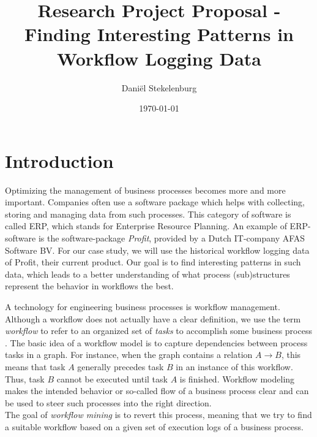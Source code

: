 \documentclass[a4paper,11pt]{article}
\begin{document}
\theoremstyle{plain}
\newtheorem{thm}{Theorem}{}

\theoremstyle{definition}
\newtheorem{defn}[thm]{Definition}

\renewcommand{\vec}[1]{\mathbf{#1}}

\title{Research Project Proposal - Finding Interesting Patterns in Workflow Logging Data}
\date{\today}
\author{
        Dani\"el Stekelenburg		
}
 
 
\maketitle

\abstract{}

\section{Introduction}
Optimizing the management of business processes becomes more and more important. Companies often use a software package which helps with collecting, storing and managing data from such processes. This category of software is called ERP, which stands for Enterprise Resource Planning. An example of ERP-software is the software-package \textit{Profit}, provided by a Dutch IT-company AFAS Software BV. For our case study, we will use the historical workflow logging data of Profit, their current product. Our goal is to find interesting patterns in such data, which leads to a better understanding of what process (sub)structures represent the behavior in workflows the best.

A technology for engineering business processes is workflow management. Although a workflow does not actually have a clear definition, we use the term \textit{workflow} to refer to an organized set of \textit{tasks} to accomplish some business process \cite{workflowManagement1995}. The basic idea of a workflow model is to capture dependencies between process tasks in a graph. For instance, when the graph contains a relation $A \rightarrow B$, this means that task $A$ generally precedes task $B$ in an instance of this workflow. Thus, task $B$ cannot be executed until task $A$ is finished. Workflow modeling makes the intended behavior or so-called flow of a business process clear and can be used to steer such processes into the right direction.\\
The goal of \textit{workflow mining} is to revert this process, meaning that we try to find a suitable workflow based on a given set of execution logs of a business process.
\end{document}
